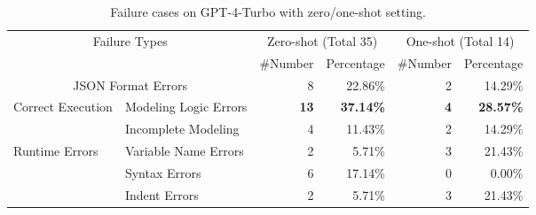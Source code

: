 \begin{table*}[ht]
\caption{Failure cases on GPT-4-Turbo with zero/one-shot setting.}
\label{tab:failures}
\vspace{-8pt}
\begin{center}
\begin{adjustbox}{max width=\textwidth}
\begin{tabular}{l|l|rr|rr}
\toprule
\multicolumn{2}{c}{\multirow{2}{*}{Failure Types}} & \multicolumn{2}{c|}{Zero-shot (Total 35)} & \multicolumn{2}{c}{One-shot (Total 14)} \\
\cmidrule{3-6}
\multicolumn{2}{c}{} & \#Number & Percentage & \#Number & Percentage \\
\midrule
\multicolumn{2}{c|}{JSON Format Errors} & 8 & 22.86\% & 2 & 14.29\% \\
\midrule
\multicolumn{1}{l|}{\multirow{2}{*}{Correct Execution}} & Modeling Logic Errors & \textbf{13} & \textbf{37.14\%} & \textbf{4} & \textbf{28.57\%} \\
    & Incomplete Modeling & 4 & 11.43\% & 2 & 14.29\% \\
\midrule
\multicolumn{1}{l|}{\multirow{3}{*}{Runtime Errors}} & Variable Name Errors & 2 & 5.71\% & 3 & 21.43\% \\
 & Syntax Errors & 6 & 17.14\% & 0 & 0.00\% \\
 & Indent Errors & 2 & 5.71\% & 3 & 21.43\% \\
\bottomrule
\end{tabular}
\end{adjustbox}
\end{center}
\vspace{-10pt}
\end{table*}
